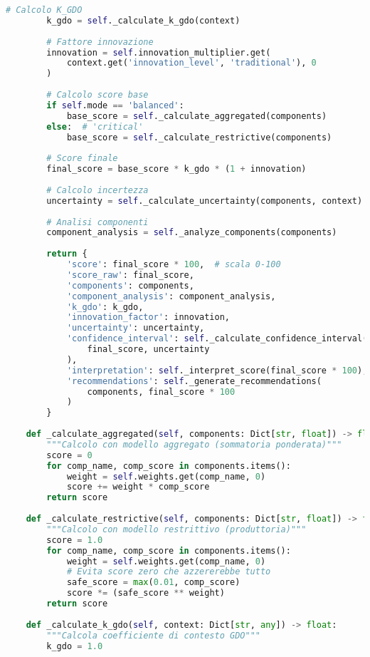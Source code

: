 \begin{lstlisting}[language=Python, caption=Classe GISTFramework Completa]
        # Calcolo K_GDO
        k_gdo = self._calculate_k_gdo(context)
        
        # Fattore innovazione
        innovation = self.innovation_multiplier.get(
            context.get('innovation_level', 'traditional'), 0
        )
        
        # Calcolo score base
        if self.mode == 'balanced':
            base_score = self._calculate_aggregated(components)
        else:  # 'critical'
            base_score = self._calculate_restrictive(components)
        
        # Score finale
        final_score = base_score * k_gdo * (1 + innovation)
        
        # Calcolo incertezza
        uncertainty = self._calculate_uncertainty(components, context)
        
        # Analisi componenti
        component_analysis = self._analyze_components(components)
        
        return {
            'score': final_score * 100,  # scala 0-100
            'score_raw': final_score,
            'components': components,
            'component_analysis': component_analysis,
            'k_gdo': k_gdo,
            'innovation_factor': innovation,
            'uncertainty': uncertainty,
            'confidence_interval': self._calculate_confidence_interval(
                final_score, uncertainty
            ),
            'interpretation': self._interpret_score(final_score * 100),
            'recommendations': self._generate_recommendations(
                components, final_score * 100
            )
        }
    
    def _calculate_aggregated(self, components: Dict[str, float]) -> float:
        """Calcolo con modello aggregato (sommatoria ponderata)"""
        score = 0
        for comp_name, comp_score in components.items():
            weight = self.weights.get(comp_name, 0)
            score += weight * comp_score
        return score
    
    def _calculate_restrictive(self, components: Dict[str, float]) -> float:
        """Calcolo con modello restrittivo (produttoria)"""
        score = 1.0
        for comp_name, comp_score in components.items():
            weight = self.weights.get(comp_name, 0)
            # Evita score zero che azzererebbe tutto
            safe_score = max(0.01, comp_score)
            score *= (safe_score ** weight)
        return score
    
    def _calculate_k_gdo(self, context: Dict[str, any]) -> float:
        """Calcola coefficiente di contesto GDO"""
        k_gdo = 1.0
        

\end{lstlisting}
